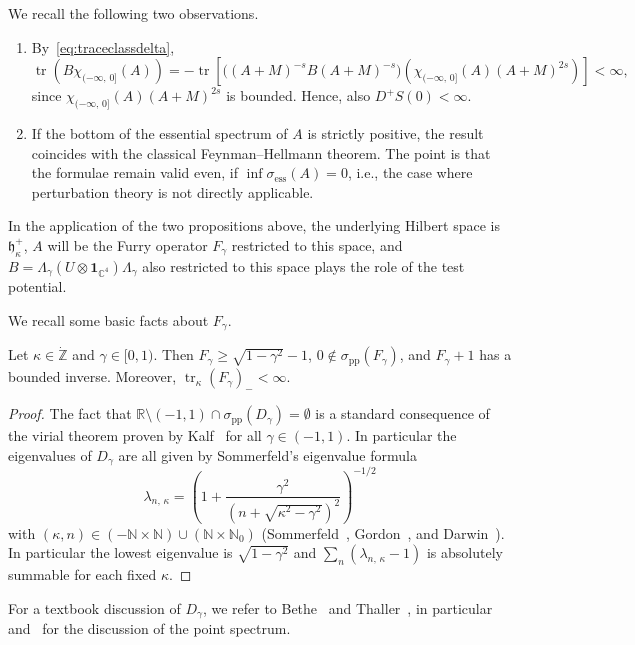 \documentclass[AHL,Unicode,longabstracts,published]{cedram}
\DeclareMathOperator{\tr}{tr}
\newcommand{\ess}{\mathrm{ess}}
\newcommand{\pp}{\mathrm{pp}}
\newcommand*\cz{\mathbb{C}}
\newcommand*\nz{\mathbb{N}}
\newcommand*\gz{\mathbb{Z}}
\newcommand*\rz{\mathbb{R}}
\newcommand*\zp{\dot{\gz}}
\newcommand{\one}{\mathbf{1}}
\newcommand*\gh{\mathfrak{h}}
\newcommand*\ghpk{{\gh^+_\kappa}}
\begin{document}
We recall the following two observations.
\begin{enumerate}
\item By~\eqref{eq:traceclassdelta},
\[
\tr\left(B\chi_{(-\infty,\,0]}(A)\right)=-\tr\left[\big((A+M)^{-s}B(A+M)^{-s}\big)\left(\chi_{(-\infty,\,0]}(A)(A+M)^{2s}\right)\right]<\infty,
\]
since $\chi_{(-\infty,\,0]}(A)(A+M)^{2s}$ is bounded. Hence, also $D^+S(0)<\infty$.

\item If the bottom of the essential spectrum of $A$ is strictly positive, the result coincides with the classical Feynman--Hellmann theorem. The point is that the formulae remain valid even, if $\inf\sigma_{\ess}(A)=0$, i.e., the case where perturbation theory is not directly applicable.
\end{enumerate}
In the application of the two propositions above, the underlying Hilbert space is $\ghpk$, $A$ will be the Furry operator $F_{\gamma}$ restricted to this space, and $B = \Lambda_\gamma(U\otimes\one_{\cz^4})\Lambda_\gamma$ also restricted to this space plays the role of the test potential.

We recall some basic facts about $F_\gamma$.
\begin{lemm}\label{hydrogen}
Let $\kappa\in\zp$ and $\gamma\in[0,1)$. Then $F_\gamma\geq\sqrt{1-\gamma^2}-1$, $0\notin\sigma_\pp(F_\gamma)$, and $F_\gamma+1$ has a bounded inverse. Moreover, $\tr_\kappa (F_\gamma)_-<\infty$.
\end{lemm}


\begin{proof}
The fact that $\rz\setminus(-1,1)\cap \sigma_\pp(D_\gamma)=\emptyset$ is a standard consequence of the virial theorem proven by Kalf~\cite{Kalf1976} for all $\gamma\in(-1,1)$. In particular the eigenvalues of $D_\gamma$ are all given by Sommerfeld's eigenvalue formula
\begin{equation}\label{eq:eigenvalue}
\lambda_{n,\,\kappa} = \left(1+\frac{\gamma^2}{\left(n+\sqrt{\kappa^2-\gamma^2}\right)^2}\right)^{-1/2}
\end{equation}
with $(\kappa,n)\in(-\nz\times\nz)\cup(\nz\times\nz_0)$ (Sommerfeld~\cite{Sommerfeld1916}, Gordon~\cite{Gordon1928}, and Darwin~\cite{Darwin1928}). In particular the lowest eigenvalue is $\sqrt{1-\gamma^2}$ and $\sum_{n}(\lambda_{n,\,\kappa}-1)$ is absolutely summable for each fixed $\kappa$.
\end{proof}

For a textbook discussion of $D_\gamma$, we refer to Bethe~\cite{Bethe1933} and Thaller~\cite{Thaller1992}, in particular~\cite[p.~314f]{Bethe1933} and~\cite[Sections~7.4.2 and~7.4.5]{Thaller1992} for the discussion of the point spectrum.
\end{document}
